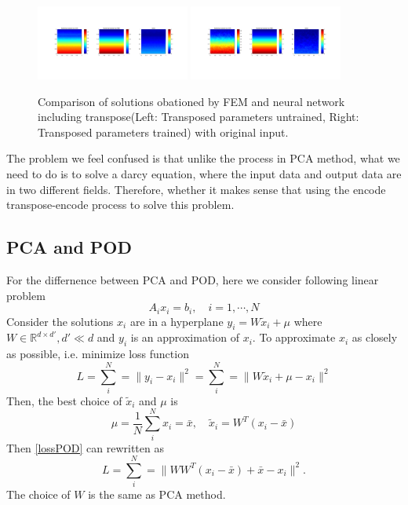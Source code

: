 	\begin{figure}[H]
		\centering
		\includegraphics[width=0.45\textwidth]{figures/Darcy_CNN/Darcy_transpose_value.png}
		\includegraphics[width=0.45\textwidth]{figures/Darcy_CNN/Darcy_transpose_novalue.png}
		\caption{Comparison of solutions obationed by FEM and neural network including transpose(Left:  Transposed parameters untrained, Right: Transposed parameters trained) with original input.}
	\end{figure}


The problem we feel confused is that unlike the process in PCA method, what we need to do is to solve a darcy equation, where the input data and output data are in two different fields. Therefore, whether it makes sense that using the encode transpose-encode process to solve this problem.

\newpage
\subsection{PCA and POD}
For the differnence between PCA and POD, here we consider following linear problem
$$
A_i x_i = b_i, \quad i = 1,\cdots,N
$$
Consider the solutions $x_i $ are in a hyperplane $y_i = W\tilde{x}_i+\mu$ where $W \in \mathbb{R}^{d\times d'}, d'\ll d $ and $y_i$ is an approximation of $x_i$. To approximate $x_i$ as closely as possible, i.e. minimize loss function
\begin{equation}\label{lossPOD}
L = \sum_{i}^{N}=\| y_i - x_i\|^2 =  \sum_{i}^{N}=\| W\tilde{x}_i +\mu - x_i\|^2
\end{equation}
Then, the best choice of $\tilde{x}_i $ and $\mu$ is
$$
\mu = \frac{1}{N}\sum_{i}^{N}x_i = \bar{x}, \quad
\tilde{x}_i = W^T(x_i-\bar{x})
$$
Then \ref{lossPOD} can rewritten as
$$
L =  \sum_{i}^{N}=\| WW^T(x_i-\bar{x}) +\bar{x} - x_i\|^2 .
$$
The choice of $W$ is the same as PCA method.\\

